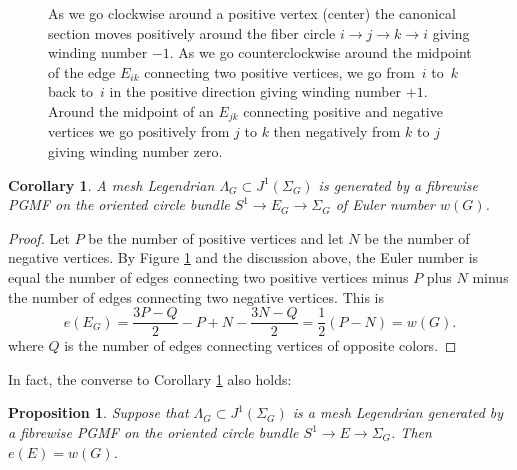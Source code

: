 \documentclass[JEP,XML,SOM,Unicode,NoFloatCountersInSection]{cedram}
\theoremstyle{plain}
\newtheorem{proposition}[theorem]{Proposition}
\newtheorem{corollary}[theorem]{Corollary}
\theoremstyle{definition}
\begin{document}
\begin{figure}[htbp]
\begin{center}
\caption{\smaller As we go clockwise around a positive vertex (center) the canonical section moves positively around the fiber circle $i\to j\to k\to i$ giving winding number $-1$. As we go counterclockwise around the midpoint of the edge $E_{ik}$ connecting two positive vertices, we go from~$i$ to~$k$ back to~$i$ in the positive direction giving winding number $+1$. Around the midpoint of an $E_{jk}$ connecting positive and negative vertices we go positively from $j$ to $k$ then negatively from $k$ to $j$ giving winding number zero.}
\label{Fig: 3 circles}
\end{center}
\end{figure}

\begin{corollary}\label{generation}
A mesh Legendrian $\Lambda_G \subset J^1(\Sigma_G)$ is generated by a fibrewise PGMF on the oriented circle bundle $S^1 \to E_G \to \Sigma_G$ of Euler number $w(G)$.
\end{corollary}

\begin{proof}
Let $P$ be the number of positive vertices and let $N$ be the number of negative vertices. By Figure \ref{Fig: 3 circles} and the discussion above, the Euler number is equal the number of edges connecting two positive vertices minus $P$ plus $N$ minus the number of edges connecting two negative vertices. This is
\[
e(E_G)=\frac{3P-Q}2-P+N-\frac{3N-Q}2=\frac12(P-N)=w(G).
\]
where $Q$ is the number of edges connecting vertices of opposite colors. \end{proof}

In fact, the converse to Corollary \ref{generation} also holds:

\begin{proposition}\label{euler for circle}
Suppose that $\Lambda_G \subset J^1(\Sigma_G)$ is a mesh Legendrian generated by a fibrewise PGMF on the oriented circle bundle $S^1 \to E \to \Sigma_G$. Then $e(E)=w(G)$.
\end{proposition}
\end{document}
